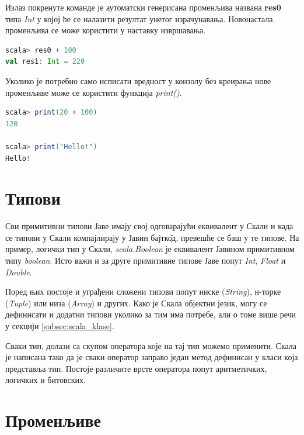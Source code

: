 \documentclass[12pt,oneside]{memoir}
\begin{document}
Излаз покренуте команде је аутоматски генерисана променљива названа \textbf{res0} типа \textit{Int} у којој ће се налазити резултат унетог израчунавања. Новонастала променљива се може користити у наставку извршавања. \cite{scala_prog}

\begin{lstlisting}[language=Scala, caption={Коришћење резултатских променљивих}, label={lst:scala_res0_example}]
scala> res0 + 100
val res1: Int = 220
\end{lstlisting}

Уколико је потребно само исписати вредност у конзолу без креирања нове променљиве може се користити функција \textit{print()}.

\begin{lstlisting}[language=Scala, caption={Функција print}, label={lst:scala_interpret_print_func}]
scala> print(20 + 100)
120

scala> print("Hello!")
Hello!
\end{lstlisting}

\section{Типови}
\label{sec:scala_tip}

Сви примитивни типови Јаве имају свој одговарајући еквивалент у Скали и када се типови у Скали компајлирају у Јавин бајтк\^{о}д, превешће се баш у те типове. На пример, логички тип у Скали, \textit{scala.Boolean} је еквивалент Јавином примитивном типу \textit{boolean}. Исто важи и за друге примитивне типове Јаве попут \textit{Int}, \textit{Float} и \textit{Double}. \cite{scala_prog}

Поред њих постоје и уграђени сложени типови попут ниске (\textit{String}), н-торке (\textit{Tuple}) или низа (\textit{Array}) и других. Како је Скала објектни језик, могу се дефинисати и додатни типови уколико за тим има потребе, али о томе више речи у секцији \ref{subsec:scala_klase}.

Сваки тип, долази са скупом оператора које на тај тип можемо применити. Скала је написана тако да је сваки оператор заправо један метод дефинисан у класи која представља тип. Постоје различите врсте оператора попут аритметичких, логичких и битовских.

\section{Променљиве}
\label{sec:scala_prom}
\end{document}
